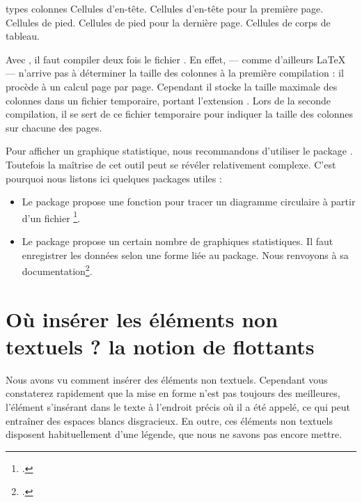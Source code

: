 \begin{latexcode}
\begin{longtable}{types colonnes}
Cellules d'en-tête.
\endhead
Cellules d'en-tête pour la première page.
\endfirsthead
Cellules de pied.
\endfoot
Cellules de pied pour la dernière page.
\endlastfoot
Cellules de corps de tableau.
\end{longtable}
\end{latexcode}

\begin{attention}
Avec , il faut compiler deux fois le fichier . 
En effet, \XeLaTeX{} --- comme d'ailleurs \LaTeX{} --- n'arrive pas à déterminer la taille des colonnes à la première compilation : il procède à un calcul page par page. Cependant il stocke la taille maximale des colonnes dans un fichier temporaire, portant l'extension . Lors de la seconde compilation, il se sert de ce fichier temporaire pour indiquer la taille des colonnes sur chacune des pages.
\end{attention}


\begin{plusloins}
Pour afficher un graphique statistique, nous recommandons d'utiliser le package . Toutefois la maîtrise de cet outil peut se révéler relativement complexe. C'est pourquoi nous listons ici quelques packages utiles : 
\begin{itemize}
\item Le package  propose une fonction pour tracer un diagramme circulaire à partir d'un fichier \footcite[Sa documentation se trouve dans celle du package  :][]{csvtools_pie}. 
\item Le package  propose un certain nombre de graphiques statistiques. Il faut enregistrer les données selon une forme liée au package. Nous renvoyons à sa documentation\footcite{datatool}.
\end{itemize}
\end{plusloins}


\section[La notion de flottants]{Où insérer les éléments non textuels ?  la notion de flottants}
\label{legende}
Nous avons vu comment insérer des éléments non textuels. Cependant vous constaterez rapidement que la mise en forme n'est pas toujours des meilleures, l'élément s'insérant dans le texte à l'endroit précis où il a été appelé, ce qui peut entraîner des espaces blancs disgracieux.
En outre, ces éléments non textuels disposent habituellement d'une légende, que nous ne savons pas encore mettre.

